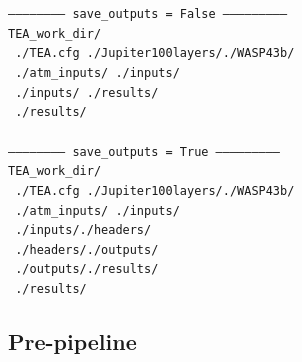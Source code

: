 {\vspace{10pt}
\small
\noindent \texttt{------------------------ save\_outputs = False
  ---------------------------
  \\ TEA\_work\_dir/\\ \-\ \hspace{0.75in}./TEA.cfg
 \hspace{0.50in}./Jupiter100layers/\hspace{1.2in}./WASP43b/\\
 \-\ \hspace{3.4in}./atm\_inputs/ \hspace{0.9in}./inputs/
  \\ \-\ \hspace{3.4in}./inputs/ \hspace{1.17in}./results/\\
 \-\ \hspace{3.4in}./results/
  \\ \\------------------------ save\_outputs = True
  ---------------------------
  \\ TEA\_work\_dir/\\ \-\ \hspace{0.75in}./TEA.cfg 
\hspace{0.50in}./Jupiter100layers/\hspace{1.2in}./WASP43b/\\ 
\-\ \hspace{3.4in}./atm\_inputs/ \hspace{0.9in}./inputs/
  \\ \-\ \hspace{3.4in}./inputs/\hspace{1.27in}./headers/
  \\ \-\ \hspace{3.4in}./headers/\hspace{1.2in}./outputs/
  \\ \-\ \hspace{3.4in}./outputs/\hspace{1.2in}./results/
  \\ \-\ \hspace{3.4in}./results/ } \normalsize

\subsection{Pre-pipeline}
\label{exec-prepipe}

}
